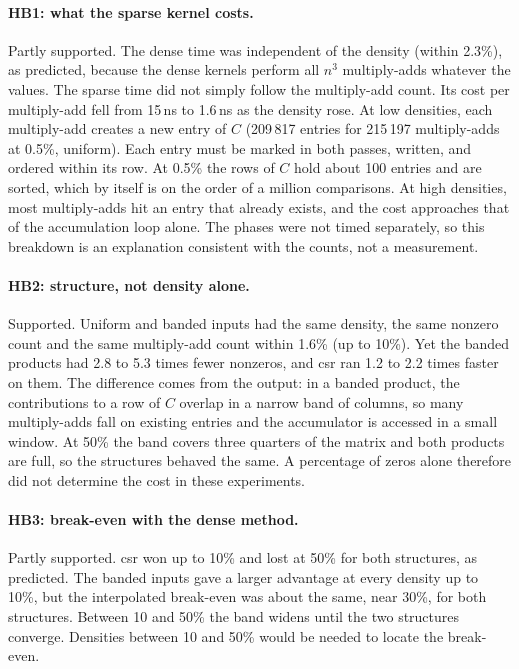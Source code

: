 \documentclass[11pt,a4paper]{article}
\begin{document}
\paragraph{HB1: what the sparse kernel costs.} Partly supported. The dense
time was independent of the density (within 2.3\%), as predicted, because the
dense kernels perform all $n^3$ multiply-adds whatever the values. The sparse
time did not simply follow the multiply-add count. Its cost per multiply-add
fell from 15\,ns to 1.6\,ns as the density rose. At low densities, each
multiply-add creates a new entry of $C$ (209\,817 entries for 215\,197
multiply-adds at 0.5\%, uniform). Each entry must be marked in both passes,
written, and ordered within its row. At 0.5\% the rows of $C$ hold about 100
entries and are sorted, which by itself is on the order of a million
comparisons. At high densities, most multiply-adds hit an entry that already
exists, and the cost approaches that of the accumulation loop alone. The
phases were not timed separately, so this breakdown is an explanation
consistent with the counts, not a measurement.

\paragraph{HB2: structure, not density alone.} Supported. Uniform and banded
inputs had the same density, the same nonzero count and the same multiply-add
count within 1.6\% (up to 10\%). Yet the banded products had 2.8 to 5.3 times
fewer nonzeros, and csr ran 1.2 to 2.2 times faster on them. The difference
comes from the output: in a banded product, the contributions to a row of $C$
overlap in a narrow band of columns, so many multiply-adds fall on existing
entries and the accumulator is accessed in a small window. At 50\% the band
covers three quarters of the matrix and both products are full, so the
structures behaved the same. A percentage of zeros alone therefore did not
determine the cost in these experiments.

\paragraph{HB3: break-even with the dense method.} Partly supported. csr won up
to 10\% and lost at 50\% for both structures, as predicted. The banded inputs
gave a larger advantage at every density up to 10\%, but the interpolated
break-even was about the same, near 30\%, for both structures. Between 10 and
50\% the band widens until the two structures converge. Densities between 10
and 50\% would be needed to locate the break-even.
\end{document}
